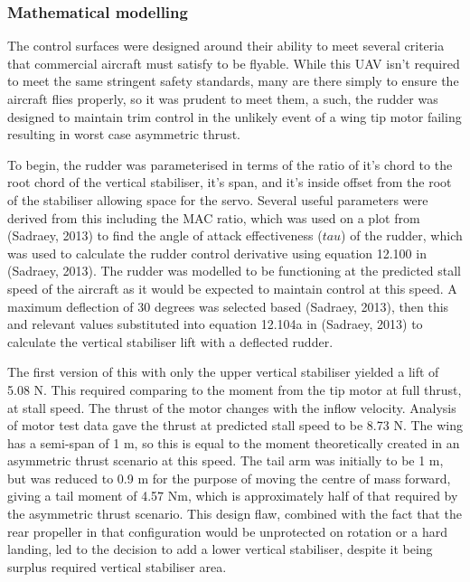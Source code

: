 \documentclass[../../main.tex]{subfiles}
\begin{document}
\subsubsection{Mathematical modelling} \label{sec:design-process:final-design-proposal:control-surfaces:mathematical-modelling}

The control surfaces were designed around their ability to meet several criteria that commercial aircraft must satisfy to be flyable. While this UAV isn’t required to meet the same stringent safety standards, many are there simply to ensure the aircraft flies properly, so it was prudent to meet them, a such, the rudder was designed to maintain trim control in the unlikely event of a wing tip motor failing resulting in worst case asymmetric thrust.  

To begin, the rudder was parameterised in terms of the ratio of it’s chord to the root chord of the vertical stabiliser, it’s span, and it’s inside offset from the root of the stabiliser allowing space for the servo.
Several useful parameters were derived from this including the MAC ratio, which was used on a plot from (Sadraey, 2013) to find the angle of attack effectiveness ($tau$) of the rudder, which was used to calculate the rudder control derivative using equation 12.100 in (Sadraey, 2013).
The rudder was modelled to be functioning at the predicted stall speed of the aircraft as it would be expected to maintain control at this speed.
A maximum deflection of 30 degrees was selected based (Sadraey, 2013), then this and relevant values substituted into equation 12.104a in (Sadraey, 2013) to calculate the vertical stabiliser lift with a deflected rudder. 

The first version of this with only the upper vertical stabiliser yielded a lift of 5.08 N.
This required comparing to the moment from the tip motor at full thrust, at stall speed.
The thrust of the motor changes with the inflow velocity.
Analysis of motor test data gave the thrust at predicted stall speed to be 8.73 N.
The wing has a semi-span of 1 m, so this is equal to the moment theoretically created in an asymmetric thrust scenario at this speed.
The tail arm was initially to be 1 m, but was reduced to 0.9 m for the purpose of moving the centre of mass forward, giving a tail moment of 4.57 Nm, which is approximately half of that required by the asymmetric thrust scenario.
This design flaw, combined with the fact that the rear propeller in that configuration would be unprotected on rotation or a hard landing, led to the decision to add a lower vertical stabiliser, despite it being surplus required vertical stabiliser area. 
\end{document}
